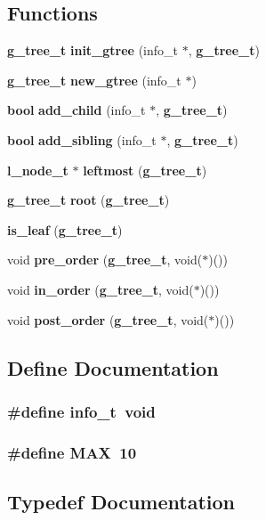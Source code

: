 \subsection*{Functions}
\begin{CompactItemize}
\item 
{\bf g\_\-tree\_\-t} {\bf init\_\-gtree} (info\_\-t $\ast$, {\bf g\_\-tree\_\-t})
\item 
{\bf g\_\-tree\_\-t} {\bf new\_\-gtree} (info\_\-t $\ast$)
\item 
{\bf bool} {\bf add\_\-child} (info\_\-t $\ast$, {\bf g\_\-tree\_\-t})
\item 
{\bf bool} {\bf add\_\-sibling} (info\_\-t $\ast$, {\bf g\_\-tree\_\-t})
\item 
{\bf l\_\-node\_\-t} $\ast$ {\bf leftmost} ({\bf g\_\-tree\_\-t})
\item 
{\bf g\_\-tree\_\-t} {\bf root} ({\bf g\_\-tree\_\-t})
\item 
{\bf is\_\-leaf} ({\bf g\_\-tree\_\-t})
\item 
void {\bf pre\_\-order} ({\bf g\_\-tree\_\-t}, void($\ast$)())
\item 
void {\bf in\_\-order} ({\bf g\_\-tree\_\-t}, void($\ast$)())
\item 
void {\bf post\_\-order} ({\bf g\_\-tree\_\-t}, void($\ast$)())
\end{CompactItemize}


\subsection{Define Documentation}
\subsubsection{\setlength{\rightskip}{0pt plus 5cm}\#define info\_\-t\ void}\label{P__gtree_8h_a0}


\subsubsection{\setlength{\rightskip}{0pt plus 5cm}\#define MAX\ 10}\label{P__gtree_8h_a1}




\subsection{Typedef Documentation}
